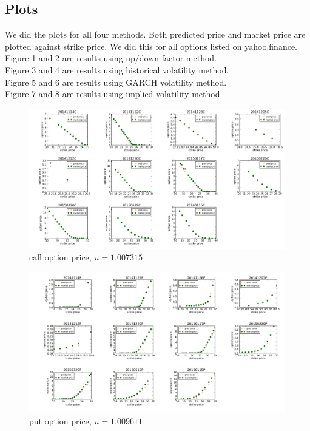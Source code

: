 \subsection{Plots}
We did the plots for all four methods. Both predicted price and market price are plotted against strike price. We did this for all options listed on yahoo.finance.\\
Figure 1 and 2 are results using up/down factor method.\\
Figure 3 and 4 are results using historical volatility method.\\
Figure 5 and 6 are results using GARCH volatility method.\\
Figure 7 and 8 are results using implied volatility method.
\begin{landscape}
\begin{figure}[H]
\centering
\includegraphics[width=\linewidth]{ucall.png}
\caption{call option price, $u=1.007315$}
\end{figure}
\begin{figure}[H]
\centering
\includegraphics[width=\linewidth]{uput.png}
\caption{put option price, $u=1.009611$}
\end{figure}


\end{landscape}
